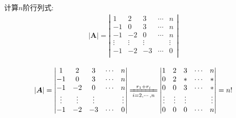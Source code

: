 \documentclass[../../main.tex]{subfiles}%
\begin{document}
\begin{example}
计算$n$阶行列式:
\begin{gather}
|\boldsymbol{A}|=\left| \begin{matrix}
1&		2&		3&		\cdots&		n\\
-1&		0&		3&		\cdots&		n\\
-1&		-2&		0&		\cdots&		n\\
\vdots&		\vdots&		\vdots&		&		\vdots\\
-1&		-2&		-3&		\cdots&		0\\
\end{matrix} \right|
\nonumber
\end{gather}
\begin{solution}
\begin{equation}
\begin{split}
|\boldsymbol{A}|=\left| \begin{matrix}
1&		2&		3&		\cdots&		n\\
-1&		0&		3&		\cdots&		n\\
-1&		-2&		0&		\cdots&		n\\
\vdots&		\vdots&		\vdots&		&		\vdots\\
-1&		-2&		-3&		\cdots&		0\\
\end{matrix} \right|
\xlongequal[i=2,\cdots ,n]{r_1+r_i}\left| \begin{matrix}
1&		2&		3&		\cdots&		n\\
0&		2&		*&		\cdots&		*\\
0&		0&		3&		\cdots&		*\\
\vdots&		\vdots&		\vdots&		&		\vdots\\
0&		0&		0&		\cdots&		n\\
\end{matrix} \right|=n!
\end{split}
\nonumber
\end{equation}

\end{solution}
\end{example}
\end{document}
